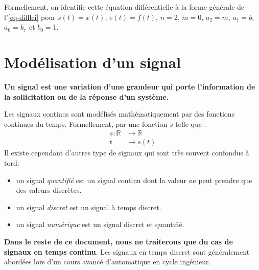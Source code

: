 Formellement, on identifie cette équation différentielle à la forme générale 
de l'\cref{eq-difflci} pour $s(t)=x(t)$, $e(t)=f(t)$, 
$n=$2, $m=0$, $a_2=m$, $a_1=b$, $a_0=k_r$ et $b_0=$1.
\section{Modélisation d'un signal}
\textbf{Un signal est une variation d'une grandeur qui porte l'information 
de la sollicitation ou de la réponse d'un système.}

Les signaux continus sont modélisés mathématiquement par des fonctions 
continues du temps. Formellement, par une fonction $s$ telle que :
\begin{align*}
s : \mathbb{R}&\rightarrow\mathbb{R} \\  
t&\rightarrow s(t) 
\end{align*}    
Il existe cependant d'autres type de signaux qui sont très souvent confondus 
à tord:
\begin{itemize}
    \item un signal \emph{quantifié} est un signal continu 
          dont la valeur ne peut prendre que des valeurs discrètes. 
    \item un signal \emph{discret} est un signal à temps discret.
    \item un signal \emph{numérique} est un signal discret et quantifié.   
\end{itemize}
\textbf{Dans le reste de ce document, nous ne traiterons que
du cas de signaux en temps continu}. Les signaux en temps discret
sont généralement abordées lors d'un cours 
avancé d'automatique en cycle ingénieur.
